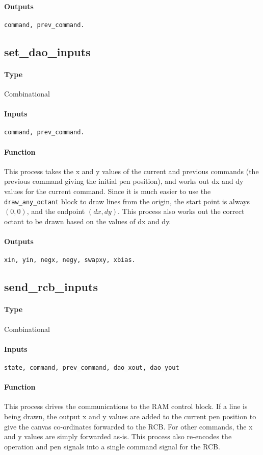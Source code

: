 \documentclass[12pt]{article}
\begin{document}
\paragraph{Outputs}
\verb|command, prev_command.|

\subsection{set\_dao\_inputs}
\paragraph{Type}
Combinational
\paragraph{Inputs}
\verb|command, prev_command.|
\paragraph{Function}
This process takes the x and y values of the current and previous
commands (the previous command giving the initial pen position), and
works out dx and dy values for the current command. Since it is much
easier to use the \verb|draw_any_octant| block to draw lines from the
origin, the start point is always $(0, 0)$, and the endpoint $(dx,
dy)$. This process also works out the correct octant to be drawn based
on the values of dx and dy.
\paragraph{Outputs}
\verb|xin, yin, negx, negy, swapxy, xbias.|

\subsection{send\_rcb\_inputs}
\paragraph{Type}
Combinational
\paragraph{Inputs}
\verb|state, command, prev_command, dao_xout, dao_yout|
\paragraph{Function}
This process drives the communications to the RAM control block. If a
line is being drawn, the output x and y values are added to the
current pen position to give the canvas co-ordinates forwarded to the
RCB. For other commands, the x and y values are simply forwarded
as-is. This process also re-encodes the operation and pen signals into
a single command signal for the RCB.
\end{document}
